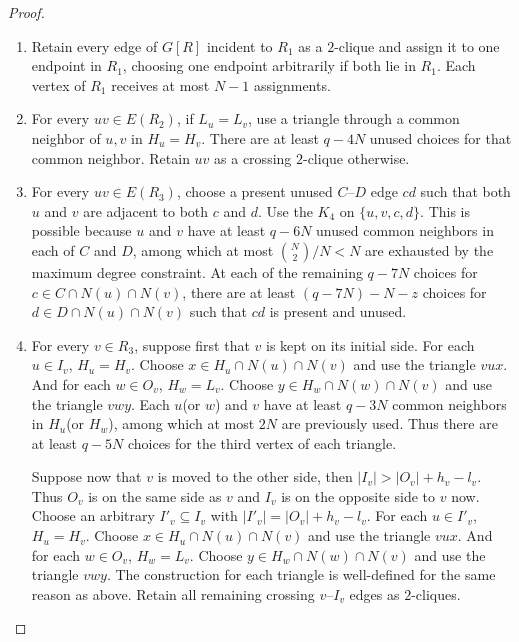 \documentclass[11pt]{article}
\numberwithin{equation}{section}
\theoremstyle{remark}
\begin{document}
\begin{proof}
\begin{enumerate}[label=\textup{(\alph*)}]
\item Retain every edge of \(G[R]\) incident to \(R_1\) as a \(2\)-clique and assign it to one endpoint in \(R_1\),
choosing one endpoint arbitrarily if both lie in \(R_1\). Each vertex of \(R_1\) receives at most \(N-1\) assignments.\label{dec:step:a}

\item For every \(uv\in E(R_2)\), if \(L_u=L_v\), use a triangle through a common neighbor of \(u,v\) in \(H_u=H_v\).
There are at least \(q-4N\) unused choices for that common neighbor. Retain \(uv\) as a crossing \(2\)-clique otherwise.\label{dec:step:b}

\item For every \(uv\in E(R_3)\), choose a present unused \(C\)--\(D\) edge \(cd\) such that both \(u\) and \(v\) are
adjacent to both \(c\) and \(d\). Use the \(K_4\) on \(\{u,v,c,d\}\). This is possible because \(u\) and \(v\) have at
least \(q-6N\) unused common neighbors in each of \(C\) and \(D\), among which at most \(\binom{N}{2}/N<N\) are exhausted
by the maximum degree constraint. At each of the remaining \(q-7N\) choices for \(c\in C\cap N(u)\cap N(v)\),
there are at least \((q-7N)-N-z\) choices for \(d\in D\cap N(u)\cap N(v)\) such that \(cd\) is present and unused.\label{dec:step:c}

\item For every \(v\in R_3\), suppose first that \(v\) is kept on its initial side.
For each \(u\in I_v\), \(H_u=H_v\). Choose \(x\in H_u\cap N(u)\cap N(v)\) and use the triangle \(vux\).
And for each \(w\in O_v\), \(H_w=L_v\). Choose \(y\in H_w\cap N(w)\cap N(v)\) and use the triangle \(vwy\).
Each \(u\)(or \(w\)) and \(v\) have at least \(q-3N\) common neighbors in \(H_u\)(or \(H_w\)),
among which at most \(2N\) are previously used. Thus there are at least \(q-5N\) choices for the third vertex of each triangle.

Suppose now that \(v\) is moved to the other side, then  \(|I_v|>|O_v|+h_v-l_v\). Thus \(O_v\) is on the same side
as \(v\) and \(I_v\) is on the opposite side to \(v\) now. Choose an arbitrary \(I'_v\subseteq I_v\) with \(|I'_v|=|O_v|+h_v-l_v\).
For each \(u\in I'_v\), \(H_u=H_v\). Choose \(x\in H_u\cap N(u)\cap N(v)\) and use the triangle \(vux\).
And for each \(w\in O_v\), \(H_w=L_v\). Choose \(y\in H_w\cap N(w)\cap N(v)\) and use the triangle \(vwy\).
The construction for each triangle is well-defined for the same reason as above. Retain all remaining crossing \(v\)--\(I_v\) edges as \(2\)-cliques.\label{dec:step:d}


\end{enumerate}
\end{proof}
\end{document}
